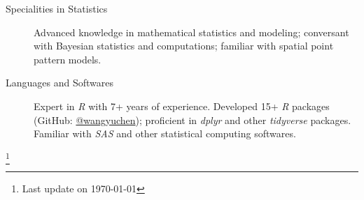\documentclass[11pt]{article}
\newcommand{\CPP}
{C\nolinebreak[4]\hspace{0em}\raisebox{.12ex}{\footnotesize\bf ++}}
\begin{document}
	\begin{description}
		\item[Specialities in Statistics] Advanced knowledge in mathematical statistics and modeling; conversant with Bayesian statistics and computations; familiar with spatial point pattern models.
		\item[Languages and Softwares] Expert in \emph{R} with 7+ years of experience. Developed 15+ \emph{R} packages (GitHub: \href{https://www.github.com/wangyuchen}{@wangyuchen}); proficient in \emph{dplyr} and other \emph{tidyverse} packages. Familiar with \emph{SAS} and other statistical computing softwares.
	\end{description}

\let\thefootnote\relax\footnote{Last update on \today}
\end{document}
